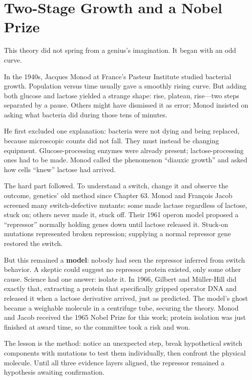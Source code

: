 \section{Two-Stage Growth and a Nobel Prize}

\begin{zhengju}
This theory did not spring from a genius's imagination. It began with an odd curve.

In the 1940s, Jacques Monod at France's Pasteur Institute studied bacterial growth. Population versus time usually gave a smoothly rising curve. But adding both glucose and lactose yielded a strange shape: rise, plateau, rise---two steps separated by a pause. Others might have dismissed it as error; Monod insisted on asking what bacteria did during those tens of minutes.

He first excluded one explanation: bacteria were not dying and being replaced, because microscopic counts did not fall. They must instead be changing equipment. Glucose-processing enzymes were already present; lactose-processing ones had to be made. Monod called the phenomenon ``diauxic growth'' and asked how cells ``knew'' lactose had arrived.

The hard part followed. To understand a switch, change it and observe the outcome, genetics' old method since Chapter 63. Monod and François Jacob screened many switch-defective mutants: some made lactase regardless of lactose, stuck on; others never made it, stuck off. Their 1961 operon model proposed a ``repressor'' normally holding genes down until lactose released it. Stuck-on mutations represented broken repression; supplying a normal repressor gene restored the switch.

But this remained a \textbf{model}: nobody had seen the repressor inferred from switch behavior. A skeptic could suggest no repressor protein existed, only some other cause. Science had one answer: isolate it. In 1966, Gilbert and Müller-Hill did exactly that, extracting a protein that specifically gripped operator DNA and released it when a lactose derivative arrived, just as predicted. The model's ghost became a weighable molecule in a centrifuge tube, securing the theory. Monod and Jacob received the 1965 Nobel Prize for this work; protein isolation was just finished at award time, so the committee took a risk and won.

The lesson is the method: notice an unexpected step, break hypothetical switch components with mutations to test them individually, then confront the physical molecule. Until all three evidence layers aligned, the repressor remained a hypothesis awaiting confirmation.
\end{zhengju}

